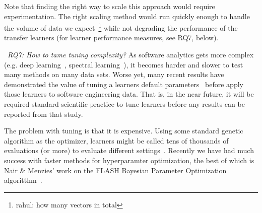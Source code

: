 Note that finding the right way to scale this approach would require experimentation. The right scaling method
would run quickly enough to handle the volume of data we expect~\footnote{rahul: how many vectors in total}  while
not degrading the performance of the transfer learners (for learner performance measures, see RQ7, below).


~{\em RQ7: How to tame tuning complexity?} As software analytics gets more complex (e.g. deep learning~\cite{weFSE17}, spectral learning~\cite{vivekEMSE}), it becomes
harder and slower to test many methods on many data sets.
Worse yet, many recent results have demonstrated the value of tuning
a learners default parameters~\cite{agrawal17,agrawal2018wrong,Tantithamthavorn18,fu2016tuning} before apply those learners to software engineering data.
That is, in the near future, it will be required standard scientific
practice to tune learners before any results can be reported from that study.

 
The problem with tuning is that it is expensive.
Using 
some
standard genetic algorithm as the optimizer,  learners might be called tens of thousands
of evaluations (or more)  to evaluate different settings~\cite{menzies18}.  Recently
we have had much success with faster methods for hyperparamter optimization, the best of which is Nair \& Menzies' work on the FLASH Bayesian Parameter Optimization algoritthm~\cite{nair18tse}. 



